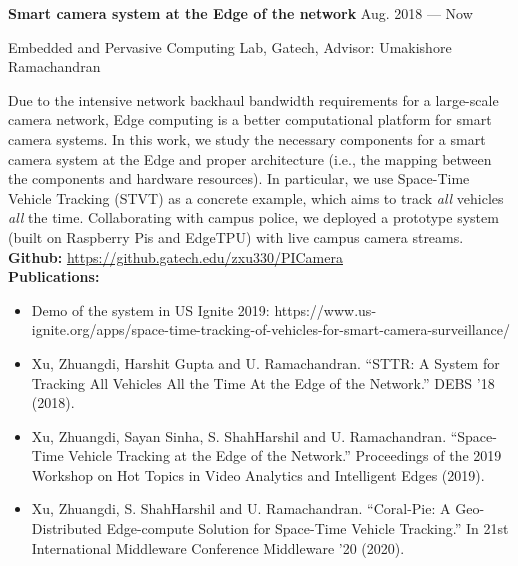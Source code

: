 \parbox[t][][t]{\linewidth}{
	\parbox{\linewidth}{\textbf{Smart camera system at the Edge of the network}
		\hfill {{Aug. 2018 --- Now}}}
		\smallbreak
	\parbox{\linewidth}{Embedded and Pervasive Computing Lab, Gatech, Advisor: Umakishore Ramachandran}
	
		\smallbreak
  Due to the intensive network backhaul bandwidth requirements for a large-scale camera network, Edge computing is a better computational platform for smart camera systems.
  In this work, we study the necessary components for a smart camera system at the Edge and proper architecture (i.e., the mapping between the components and hardware resources).
  In particular, we use Space-Time Vehicle Tracking (STVT) as a concrete example, which aims to track \textit{all} vehicles \textit{all} the time.
  Collaborating with campus police, we deployed a prototype system (built on Raspberry Pis and EdgeTPU) with live campus camera streams. \\
  \textbf{Github:} \url{https://github.gatech.edu/zxu330/PICamera} \\
  \textbf{Publications:}
	\begin{itemize}
    \item{Demo of the system in US Ignite 2019: https://www.us-ignite.org/apps/space-time-tracking-of-vehicles-for-smart-camera-surveillance/}\\
      [-1em]
    \item{Xu, Zhuangdi, Harshit Gupta and U. Ramachandran. “STTR: A System for Tracking All Vehicles All the Time At the Edge of the Network.” DEBS '18 (2018).}\\
      [-1em]
    \item{Xu, Zhuangdi, Sayan Sinha, S. ShahHarshil and U. Ramachandran. “Space-Time Vehicle Tracking at the Edge of the Network.” Proceedings of the 2019 Workshop on Hot Topics in Video Analytics and Intelligent Edges (2019).}\\
      [-1em]
    \item{Xu, Zhuangdi, S. ShahHarshil and U. Ramachandran. “Coral-Pie: A Geo-Distributed Edge-compute Solution for Space-Time Vehicle Tracking.” In 21st International Middleware Conference Middleware ’20 (2020).}\\
      [-1em]
	\end{itemize}
	\bigskip
}



